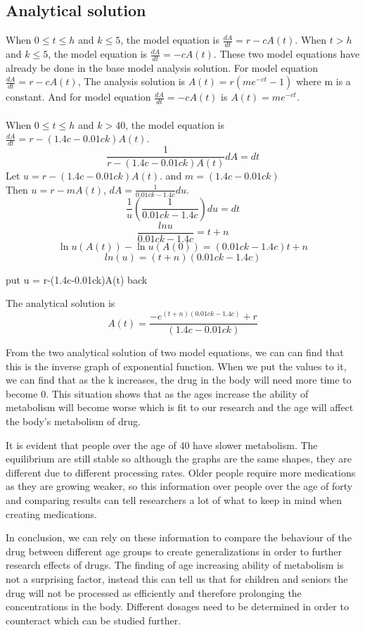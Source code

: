 \documentclass{article}
\begin{document}
\subsection*{Analytical solution}
When $0 \leq t \leq h$ and $k \leq 5$, the model equation is  $\frac{dA}{dt} =r-{c}A(t)$. When $t > h$ and $k \leq 5$, the model equation is $\frac{dA}{dt} =-{c}A(t)$. These two model equations have already be done in the base model analysis solution. For model equation $\frac{dA}{dt} =r-{c}A(t)$, The analysis solution is $A(t) = r(me^{-ct}-1)$ where m is a constant. And for model equation $\frac{dA}{dt} =-{c}A(t)$ is $A(t) = me^{-ct}$.\\
\\
When $0 \leq t \leq h$ and $k > 40$, the model equation is  $\frac{dA}{dt} =r-(1.4c-0.01ck)A(t)$.
$$
\frac{1}{r-(1.4c-0.01ck)A(t)}dA = dt
$$
Let $u = r-(1.4c-0.01ck)A(t)$. and $m = (1.4c-0.01ck) $\\
Then $u=r-mA(t)$, $dA = \frac{1}{0.01ck-1.4c}du$.\\
$$
\frac{1}{u}( \frac{1}{0.01ck-1.4c})du = dt
$$
$$
\frac{ln u}{0.01ck-1.4c} = t + n
$$
$$
\ln u(A(t)) - \ln u(A(0)) = (0.01ck-1.4c)t + n
$$
$$ln(u) = (t+n)(0.01ck-1.4c)$$

put u = r-(1.4c-0.01ck)A(t) back

The analytical solution is 
$$A(t) = \frac{-e^{(t+n)(0.01ck-1.4c)}+r}{(1.4c-0.01ck)}$$

From the two analytical solution of two model equations, we can can find that this is the inverse graph of exponential function. When we put the values to it, we can find that as the k increases, the drug in the body will need more time to become 0. This situation shows that as the ages increase the ability of metabolism will become worse which is fit to our research and the age will affect the body's metabolism of drug.

It is evident that people over the age of 40 have slower metabolism. The equilibrium are still stable so although the graphs are the same shapes, they are different due to different processing rates. Older people require more medications as they are growing weaker, so this information over people over the age of forty and comparing results can tell researchers a lot of what to keep in mind when creating medications. 

In conclusion, we can rely on these information to compare the behaviour of the drug between different age groups to create generalizations in order to further research effects of drugs. The finding of age increasing ability of metabolism is not a surprising factor, instead this can tell us that for children and seniors the drug will not be processed as efficiently and therefore prolonging the concentrations in the body. Different dosages need to be determined in order to counteract which can be studied further. 
\end{document}
